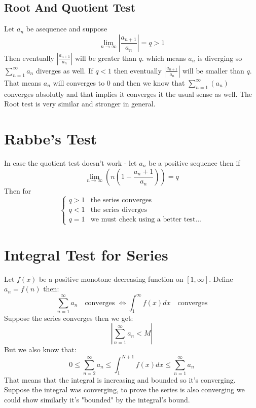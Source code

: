 \documentclass{article}
\begin{document}
	\subsection{Root And Quotient Test}
	Let $a_n$ be asequence and suppose
	\[
		\lim_{n\to\infty} \left| \frac{a_{n+1}}{a_n} \right| = q > 1
	\]
	Then eventually $\left|\frac{a_{n+1}}{a_n}\right|$ will be greater than $q$. 
	which means $a_n$ is diverging so $\sum_{n=1}^{\infty}{a_n}$ 
	diverges as well. 
	If $q<1$ then eventually $\left|\frac{a_{n+1}}{a_n}\right|$ will be smaller than $q$. 
	That means $a_n$ will converges to $0$ and then we know that 
	$\sum_{n=1}^{\infty}(a_n)$ converges absolutly 
	and that implies it converges it the usual sense as well. 
	The Root test is very similar and stronger in general.
	
	\section{Rabbe's Test}
	In case the quotient test doesn't work - let $a_n$ be a positive sequence then if
	\[
	\lim_{n\to\infty}{\left(n\left(1-\frac{a_n+1}{a_n}\right)\right)} = q
	\]
	Then for
	\[
	\begin{cases}
		q > 1 & \text{the series converges} \\
		q < 1 & \text{the series diverges} \\
		q = 1 & \text{we must check using a better test...}
	\end{cases}
	\]
	
	\newpage
	
	\section{Integral Test for Series}
	Let $f(x)$ be a positive monotone decreasing function on $[1,\infty]$. 
	Define $a_n = f(n)$ then:
	\[
	\sum_{n=1}^{\infty}{a_n} \quad \text{converges } \iff 
	\int_{1}^{\infty}{f(x)dx} \quad\text{converges}
	\]
	Suppose the series converges then we get:
	\[
		\left| \sum_{n=1}^{\infty}{a_n} < M \right|
	\]
	But we also know that:
	\[
	0 \le \sum_{n=2}^{\infty}{a_n} \le 
	\int_{1}^{N+1}f(x)dx \le \sum_{n=1}^{\infty}{a_n}
	\]
	That means that the integral is increasing and bounded so it's converging. 
	Suppose the integral was converging, to prove the series is also converging 
	we could show similarly it's "bounded" by the integral's bound.
	
	\newpage
	
\end{document}
